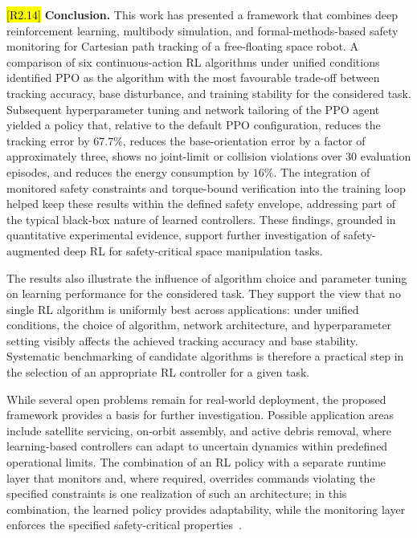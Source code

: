 \documentclass{ieeeaccess}
\newcommand{\hltwo}[1]{{\sethlcolor{rtwo}\hl{#1}}}
\newenvironment{rtwohl}
  {\def\FrameCommand{\colorbox{rtwo}}\MakeFramed{\advance\hsize-\width\FrameRestore}}
  {\endMakeFramed}
\begin{document}
\begin{rtwohl}
\hltwo{[R2.14]} \textbf{Conclusion.} This work has presented a framework that combines deep reinforcement learning, multibody simulation, and formal-methods-based safety monitoring for Cartesian path tracking of a free-floating space robot. A comparison of six continuous-action RL algorithms under unified conditions identified PPO as the algorithm with the most favourable trade-off between tracking accuracy, base disturbance, and training stability for the considered task. Subsequent hyperparameter tuning and network tailoring of the PPO agent yielded a policy that, relative to the default PPO configuration, reduces the tracking error by $67.7\%$, reduces the base-orientation error by a factor of approximately three, shows no joint-limit or collision violations over 30 evaluation episodes, and reduces the energy consumption by $16\%$. The integration
of monitored safety constraints and torque-bound verification into the training loop helped keep these results
within the defined safety envelope, addressing part of the typical black-box
nature of learned controllers. These findings, grounded in quantitative experimental evidence,
support further investigation of safety-augmented deep RL for safety-critical space manipulation tasks.
\end{rtwohl}



The results also illustrate the influence of algorithm choice and parameter tuning on learning performance for the considered task. They support the view that no single RL algorithm is uniformly best across applications: under unified conditions, the choice of algorithm, network architecture, and hyperparameter setting visibly affects the achieved tracking accuracy and base stability. Systematic benchmarking of candidate algorithms is therefore a practical step in the selection of an appropriate RL controller for a given task.

While several open problems remain for real-world deployment, the proposed framework provides a basis for further investigation. Possible application areas include satellite servicing, on-orbit assembly, and active debris removal, where learning-based controllers can adapt to uncertain dynamics within predefined operational limits. The combination of an RL policy with a separate runtime layer that monitors and, where required, overrides commands violating the specified constraints is one realization of such an architecture; in this combination, the learned policy provides adaptability, while the monitoring layer enforces the specified safety-critical properties~\cite{b1,b23}.
\end{document}
